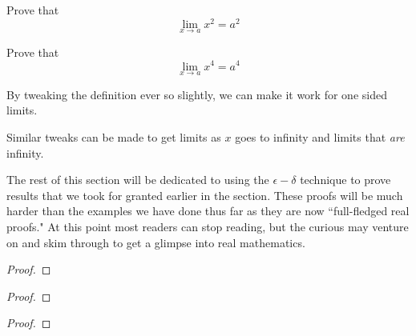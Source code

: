 \begin{example}
	Prove that
	\[ \lim_{x \to a} x^2 = a^2 \]
\end{example}

\begin{example}
	Prove that
	\[ \lim_{x \to a} x^4 = a^4 \]
\end{example}

By tweaking the definition ever so slightly, we can make it work for one sided limits.

\begin{definition}

\end{definition}

Similar tweaks can be made to get limits as $x$ goes to infinity and limits that \emph{are} infinity.

\begin{definition}

\end{definition}

The rest of this section will be dedicated to using the $\epsilon-\delta$ technique to prove results that we took for granted earlier in the section. These proofs will be much harder than the examples we have done thus far as they are now ``full-fledged real proofs." At this point most readers can stop reading, but the curious may venture on and skim through to get a glimpse into real mathematics.

\begin{theorem}

\end{theorem}
\begin{proof}

\end{proof}

\begin{theorem}

\end{theorem}
\begin{proof}

\end{proof}

\begin{theorem}

\end{theorem}
\begin{proof}

\end{proof}